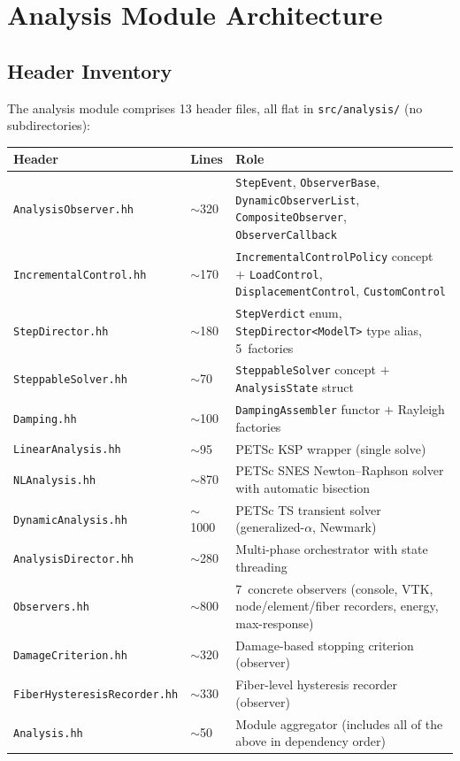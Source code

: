 \section{Analysis Module Architecture}
\label{sec:arch:analysis}


\subsection{Header Inventory}
\label{sec:arch:analysis:inventory}

The analysis module comprises 13 header files, all flat in
\texttt{src/analysis/} (no subdirectories):

\begin{center}
\small
\begin{tabular}{@{}llp{7.5cm}@{}}
\toprule
\textbf{Header} & \textbf{Lines} & \textbf{Role} \\
\midrule
\texttt{AnalysisObserver.hh}     & $\sim$320 & \texttt{StepEvent}, \texttt{ObserverBase}, \texttt{DynamicObserverList}, \texttt{CompositeObserver}, \texttt{ObserverCallback} \\
\texttt{IncrementalControl.hh}   & $\sim$170 & \texttt{IncrementalControlPolicy} concept $+$ \texttt{LoadControl}, \texttt{DisplacementControl}, \texttt{CustomControl} \\
\texttt{StepDirector.hh}         & $\sim$180 & \texttt{StepVerdict} enum, \texttt{StepDirector<ModelT>} type alias, 5~factories \\
\texttt{SteppableSolver.hh}      & $\sim$70  & \texttt{SteppableSolver} concept $+$ \texttt{AnalysisState} struct \\
\texttt{Damping.hh}              & $\sim$100 & \texttt{DampingAssembler} functor $+$ Rayleigh factories \\
\texttt{LinearAnalysis.hh}       & $\sim$95  & PETSc KSP wrapper (single solve) \\
\texttt{NLAnalysis.hh}           & $\sim$870 & PETSc SNES Newton--Raphson solver with automatic bisection \\
\texttt{DynamicAnalysis.hh}      & $\sim$1000& PETSc TS transient solver (generalized-$\alpha$, Newmark) \\
\texttt{AnalysisDirector.hh}     & $\sim$280 & Multi-phase orchestrator with state threading \\
\texttt{Observers.hh}            & $\sim$800 & 7~concrete observers (console, VTK, node/element/fiber recorders, energy, max-response) \\
\texttt{DamageCriterion.hh}      & $\sim$320 & Damage-based stopping criterion (observer) \\
\texttt{FiberHysteresisRecorder.hh} & $\sim$330 & Fiber-level hysteresis recorder (observer) \\
\texttt{Analysis.hh}             & $\sim$50  & Module aggregator (includes all of the above in dependency order) \\
\bottomrule
\end{tabular}
\end{center}


